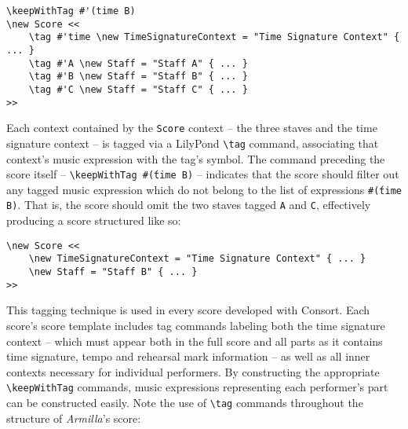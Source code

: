 \begin{singlespacing}
\vspace{-0.5\baselineskip}
\begin{verbatim}
\keepWithTag #'(time B)
\new Score <<
    \tag #'time \new TimeSignatureContext = "Time Signature Context" { ... }
    \tag #'A \new Staff = "Staff A" { ... }
    \tag #'B \new Staff = "Staff B" { ... }
    \tag #'C \new Staff = "Staff C" { ... }
>>
\end{verbatim}
\end{singlespacing}

\noindent Each context contained by the \texttt{Score} context -- the three
staves and the time signature context -- is tagged via a LilyPond
\texttt{\textbackslash{}tag} command, associating that context's music
expression with the tag's symbol. The command preceding the score itself --
\texttt{\textbackslash{}keepWithTag \#\'(time B)} -- indicates that the score
should filter out any tagged music expression which do not belong to the list
of expressions \texttt{\#\'(time B)}. That is, the score should omit the two
staves tagged \texttt{A} and \texttt{C}, effectively producing a score
structured like so:

\begin{singlespacing}
\vspace{-0.5\baselineskip}
\begin{verbatim}
\new Score <<
    \new TimeSignatureContext = "Time Signature Context" { ... }
    \new Staff = "Staff B" { ... }
>>
\end{verbatim}
\end{singlespacing}

\noindent This tagging technique is used in every score developed with Consort.
Each score's score template includes tag commands labeling both the time
signature context -- which must appear both in the full score and all parts as
it contains time signature, tempo and rehearsal mark information -- as well as
all inner contexts necessary for individual performers. By constructing the
appropriate \texttt{\textbackslash{}keepWithTag} commands, music expressions
representing each performer's part can be constructed easily.
Note the use of \texttt{\textbackslash{}tag} commands throughout the structure
of \emph{Armilla}'s score:


